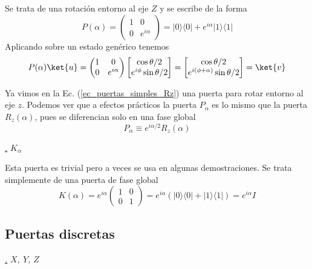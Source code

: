 \documentclass[a4paper,11pt]{book} %
\numberwithin{equation}{chapter}
\def\lp{\left(}
\def\rp{\right)}
\newcommand{\ketbra}[2]{| #1\rangle \! \langle #2|}
\def\subsubiContadorIt{\par\addtocounter{subsubsection}{1}\underline{\it\thesubsubsection.}\hskip0.5cm \setcounter{subsubsubsectionIt}{0}}
\newcommand{\SubsubiIt}[1]{
		\subsubiContadorIt \textit{#1}
	}
\newcounter{subsubsubsectionIt}[subsubsection]
\begin{document}
Se trata de una rotación entorno al eje $Z$ y se escribe de la forma		    
	\begin{equation}
	\boxed{P(\alpha)= \lp \begin{matrix}
	1 & 0 \\ 0 & e^{i\alpha} 
	\end{matrix} \rp =  \ketbra{0}{0} + e^{i\alpha}\ketbra{1}{1}}
	\end{equation}
Aplicando sobre un estado genérico tenemos
	\begin{equation*}
	P(\alpha) \ket{u} =  
	\lp \begin{matrix} 1 & 0 \\ 0 & e^{i\alpha} \end{matrix} \rp 
	\begin{bmatrix} \cos\theta/2 \\ e^{i\phi}  \sin\theta/2 \end{bmatrix} =
	 \begin{bmatrix} \cos\theta/2 \\ e^{i(\phi+\alpha)}  \sin\theta/2 \end{bmatrix} = 
	 \ket{v}
	\end{equation*}

Ya vimos en la Ec. (\ref{ec_puertas_simples_Rz}) una puerta para rotar entorno al eje $z$. Podemos ver que a efectos prácticos la puerta $P_\alpha$ es lo mismo que la puerta $R_z(\alpha)$, pues se diferencian solo en una fase global
	\begin{equation*}
	P_\alpha \equiv e^{i \alpha/2} R_z (\alpha)
	\end{equation*}
		    
		    		    
		    \SubsubiIt{$K_\alpha$}  

Esta puerta es trivial pero a veces se usa en algunas demostraciones. Se trata simplemente de una puerta de fase global
	\begin{equation}
	K(\alpha)= e^{i\alpha} \lp \begin{matrix} 1 & 0 \\ 0 & 1 \end{matrix} \rp =  
	e^{i\alpha} \lp  \ketbra{0}{0} + \ketbra{1}{1} \right) = e^{i\alpha} I 
	\end{equation}
    	
        \subsection{Puertas discretas}
        
            \SubsubiIt{$X$, $Y$, $Z$}
\end{document}
